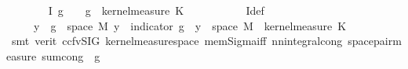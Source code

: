 \begin{isabellebody}
\ \ \ \ \ \ \isamarkupfalse%
\ {\isachardoublequoteopen}I\ g\ {\isasymomega}\ {\isacharequal}{\kern0pt}\ {\isacharparenleft}{\kern0pt}{\isasymintegral}\isactrlsup {\isacharplus}{\kern0pt}{\isasymomega}\ g{\isacharparenleft}{\kern0pt}{\isasymomega}\ {\isasymomega}\ {\isasympartial}kernel{\isacharunderscore}{\kern0pt}measure\ K\ {\isasymomega}\isanewline
\ \ \ \ \ \ \ \ \isamarkupfalse%
\ I{\isacharunderscore}{\kern0pt}def\ \isacommand{{\isachardot}{\kern0pt}{\isachardot}{\kern0pt}}\isamarkupfalse%
\isanewline
\ \ \ \ \ \ \isamarkupfalse%
\ \isamarkupfalse%
\ {\isachardoublequoteopen}{\isachardot}{\kern0pt}{\isachardot}{\kern0pt}{\isachardot}{\kern0pt}\ \ {\isacharequal}{\kern0pt}\ {\isacharparenleft}{\kern0pt}{\isasymintegral}\isactrlsup {\isacharplus}{\kern0pt}{\isasymomega}\ {\isacharparenleft}{\kern0pt}{\isasymSum}y\ {\isasymin}\ g\ {\isacharbackquote}{\kern0pt}\ space\ {\isacharquery}{\kern0pt}M{\isachardot}{\kern0pt}\ y\ {\isacharasterisk}{\kern0pt}\ {\isacharparenleft}{\kern0pt}indicator\ {\isacharparenleft}{\kern0pt}g\ {\isacharminus}{\kern0pt}{\isacharbackquote}{\kern0pt}\ {\isacharbraceleft}{\kern0pt}y{\isacharbraceright}{\kern0pt}\ {\isasyminter}\ space\ {\isacharquery}{\kern0pt}M{\isacharparenright}{\kern0pt}{\isacharparenleft}{\kern0pt}{\isasymomega}\ {\isasymomega}\ {\isasympartial}kernel{\isacharunderscore}{\kern0pt}measure\ K\ {\isasymomega}\isanewline
\ \ \ \ \ \ \ \ \isamarkupfalse%
\ {\isacharparenleft}{\kern0pt}smt\ {\isacharparenleft}{\kern0pt}verit{\isacharcomma}{\kern0pt}\ ccfv{\isacharunderscore}{\kern0pt}SIG{\isacharparenright}{\kern0pt}\ kernel{\isacharunderscore}{\kern0pt}measure{\isacharunderscore}{\kern0pt}space\ mem{\isacharunderscore}{\kern0pt}Sigma{\isacharunderscore}{\kern0pt}iff\ nn{\isacharunderscore}{\kern0pt}integral{\isacharunderscore}{\kern0pt}cong\ space{\isacharunderscore}{\kern0pt}pair{\isacharunderscore}{\kern0pt}measure\ sum{\isachardot}{\kern0pt}cong\ {\isacharasterisk}{\kern0pt}\ g{\isacharparenright}{\kern0pt}\isanewline

\end{isabellebody}

